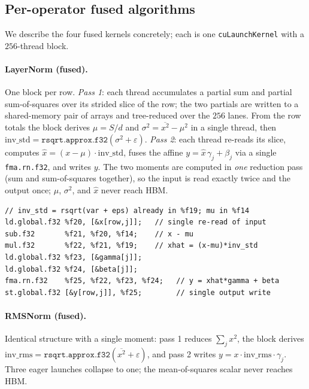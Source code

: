 \documentclass[11pt,a4paper]{article}
\begin{document}
\subsection{Per-operator fused algorithms}
\label{sec:algos}

We describe the four fused kernels concretely; each is one
\texttt{cuLaunchKernel} with a $256$-thread block.

\paragraph{LayerNorm (fused).} One block per row. \emph{Pass 1}: each thread
accumulates a partial sum and partial sum-of-squares over its strided slice of
the row; the two partials are written to a shared-memory pair of arrays and
tree-reduced over the $256$ lanes. From the row totals the block derives
$\mu = S/d$ and $\sigma^2 = \overline{x^2} - \mu^2$ in a single thread, then
$\mathrm{inv\_std} = \texttt{rsqrt.approx.f32}(\sigma^2 + \varepsilon)$.
\emph{Pass 2}: each thread re-reads its slice, computes
$\hat x = (x-\mu)\cdot\mathrm{inv\_std}$, fuses the affine
$y = \hat x\,\gamma_j + \beta_j$ via a single \texttt{fma.rn.f32}, and writes
$y$. The two moments are computed in \emph{one} reduction pass (sum and
sum-of-squares together), so the input is read exactly twice and the output once;
$\mu$, $\sigma^2$, and $\hat x$ never reach HBM.

\begin{lstlisting}[caption={Fused LayerNorm PTX (skeleton; pass-2 inner loop).},captionpos=b]
// inv_std = rsqrt(var + eps) already in %f19; mu in %f14
ld.global.f32 %f20, [&x[row,j]];   // single re-read of input
sub.f32       %f21, %f20, %f14;    // x - mu
mul.f32       %f22, %f21, %f19;    // xhat = (x-mu)*inv_std
ld.global.f32 %f23, [&gamma[j]];
ld.global.f32 %f24, [&beta[j]];
fma.rn.f32    %f25, %f22, %f23, %f24;   // y = xhat*gamma + beta
st.global.f32 [&y[row,j]], %f25;        // single output write
\end{lstlisting}

\paragraph{RMSNorm (fused).} Identical structure with a single moment: pass 1
reduces $\sum_j x^2$, the block derives
$\mathrm{inv\_rms} = \texttt{rsqrt.approx.f32}(\overline{x^2}+\varepsilon)$, and
pass 2 writes $y = x\cdot\mathrm{inv\_rms}\cdot\gamma_j$. Three eager launches
collapse to one; the mean-of-squares scalar never reaches HBM.
\end{document}
